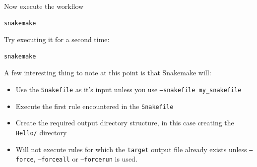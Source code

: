 \begin{steps}

Now execute the workflow

\begin{lstlisting}
snakemake
\end{lstlisting}

Try executing it for a second time:

\begin{lstlisting}
snakemake
\end{lstlisting}

\end{steps}

\begin{note}

A few interesting thing to note at this point is that Snakemake will:

\begin{itemize}
  \item Use the \texttt{Snakefile} as it's input unless you use \texttt{--snakefile my\_snakefile}
  \item Execute the first rule encountered in the \texttt{Snakefile}
  \item Create the required output directory structure, in this case creating the \texttt{Hello/} directory
  \item Will not execute rules for which the \texttt{target} output file already exists unless \texttt{--force}, \texttt{--forceall} or \texttt{--forcerun} is used.
\end{itemize}

\end{note}

